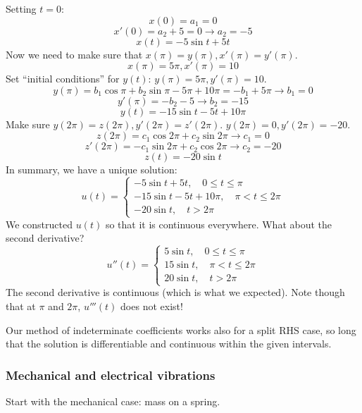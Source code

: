 \documentclass{article}
\newcommand{\mathpi}{\pi}
\begin{document}
Setting $t = 0 :$
\[ x (0) = a_1 = 0 \]
\[ x' (0) = a_2 + 5 = 0 \rightarrow a_2 = - 5 \]
\[ x (t) = - 5 \sin t + 5 t \]
Now we need to make sure that $x (\mathpi) = y (\mathpi), x' (\mathpi) = y'
(\mathpi)$.
\[ x (\mathpi) = 5 \mathpi, x' (\mathpi) = 10 \]
Set ``initial conditions'' for $y (t)$: $y (\mathpi) = 5 \mathpi, y' (\mathpi)
= 10$.
\[ y (\mathpi) = b_1 \cos \mathpi + b_2 \sin \mathpi - 5 \mathpi + 10 \mathpi
   = - b_1 + 5 \mathpi \rightarrow b_1 = 0 \]
\[ y' (\mathpi) = - b_2 - 5 \rightarrow b_2 = - 15 \]
\[ y (t) = - 15 \sin t - 5 t + 10 \mathpi \]
Make sure $y (2 \mathpi) = z (2 \mathpi), y' (2 \mathpi) = z' (2 \mathpi)$. $y
(2 \mathpi) = 0, y' (2 \mathpi) = - 20$.
\[ z (2 \mathpi) = c_1 \cos 2 \mathpi + c_2 \sin 2 \mathpi \rightarrow c_1 = 0
\]
\[ z' (2 \mathpi) = - c_1 \sin 2 \mathpi + c_2 \cos 2 \mathpi \rightarrow c_2
   = - 20 \]
\[ z (t) = - 20 \sin t \]
In summary, we have a unique solution:
\[ u (t) = \left\{\begin{array}{l}
     - 5 \sin t + 5 t, \quad 0 \leq t \leq \mathpi\\
     - 15 \sin t - 5 t + 10 \mathpi, \quad \mathpi < t \leq 2 \mathpi\\
     - 20 \sin t, \quad t > 2 \mathpi
   \end{array}\right. \]
We constructed $u (t)$ so that it is continuous everywhere. What about the
second derivative?
\[ u'' (t) = \left\{\begin{array}{l}
     5 \sin t, \quad 0 \leq t \leq \mathpi\\
     15 \sin t, \quad \mathpi < t \leq 2 \mathpi\\
     20 \sin t, \quad t > 2 \mathpi
   \end{array}\right. \]
The second derivative is continuous (which is what we expected). Note though
that at $\mathpi$ and $2 \mathpi$, $u''' (t)$ does not exist!

Our method of indeterminate coefficients works also for a split RHS case, so
long that the solution is differentiable and continuous within the given
intervals.

\subsubsection{Mechanical and electrical vibrations}

Start with the mechanical case: mass on a spring.

\begin{center}
\end{center}
\end{document}
